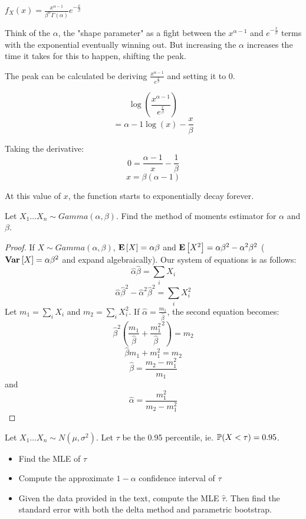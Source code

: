 \documentclass[10pt]{article}
\begin{document}
\begin{note}
    $f_X(x) = \frac{x^{\alpha-1}}{\beta^{\alpha}\Gamma(\alpha)}e^{-\frac{x}{\beta}}$

    Think of the $\alpha$, the "shape parameter" as a fight between the
    $x^{\alpha-1}$ and $e^{-\frac{x}{\beta}}$ terms with the exponential
    eventually winning out. But increasing the $\alpha$ increases the time it
    takes for this to happen, shifting the peak.

    The peak can be calculated be deriving
    $\frac{x^{\alpha-1}}{e^{\frac{x}{\beta}}}$ and setting it to 0.

    \[ \log (\frac{x^{\alpha-1}}{e^{\frac{x}{\beta}}}) \]
    \[ = \alpha-1\log({x}) - \frac{x}{\beta} \]

    Taking the derivative:
    \[ 0 = \frac{\alpha-1}{x} - \frac{1}{\beta}\]
    \[ x = \beta(\alpha-1)\]

    At this value of $x$, the function starts to exponentially decay forever.
\end{note}

\begin{exercise}
    Let $X_1 \dots X_n \sim Gamma(\alpha, \beta)$. Find the method of moments
    estimator for $\alpha$ and $\beta$.
\end{exercise}

\begin{proof}
    If $X \sim Gamma(\alpha, \beta)$, $\E{X} = \alpha\beta$ and $\E{X^2} =
    \alpha\beta^2 - \alpha^2\beta^2$ ($\Var{X} = \alpha\beta^2$ and expand
    algebraically). Our system of equations is as follows:
    \[ \hat{\alpha}\hat{\beta} = \sum_i X_i \]
    \[ \hat{\alpha}\hat{\beta}^2 - \hat{\alpha}^2\hat{\beta}^2 = \sum_i X_i^2 \]
    Let $m_1 = \sum_i X_i$ and $m_2 = \sum_i X_i^2$. If $\hat{\alpha} =
    \frac{m_1}{\hat{\beta}}$, the second equation becomes:
    \[\hat{\beta}^2(\frac{m_1}{\hat{\beta}} + \frac{m_1^2}{\hat{\beta}}^2) = m_2\]
    \[\hat{\beta}m_1 + m_1^2 = m_2\]
    \[\hat{\beta} = \frac{m_2 - m_1^2}{m_1}\]
    and
    \[\hat{\alpha} = \frac{m_1^2}{m_2 - m_1^2}\]
\end{proof}


\setcounter{exercise}{2}
\begin{exercise}
    Let $X_1 \dots X_n \sim N(\mu, \sigma^2)$. Let $\tau$ be the 0.95
    percentile, ie. $\P(X < \tau) = 0.95$.
    \begin{itemize}
        \item{Find the MLE of $\tau$}
        \item{Compute the approximate $1-\alpha$ confidence interval of $\tau$}
        \item{Given the data provided in the text, compute the MLE $\hat{\tau}$. Then find the standard error with both the delta method and parametric bootstrap.}
    \end{itemize}
\end{exercise}
\end{document}
